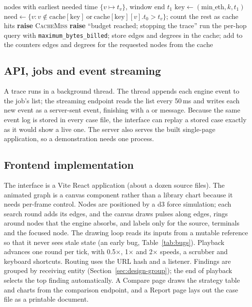 \begin{algorithm}[H]
\caption{Provider fetch with cache and budget}\label{alg:fetch}
\small\singlespacing
\begin{algorithmic}[1]
\Require nodes with earliest needed time $\{v\mapsto t_v\}$, window end $t_1$
\State $\mathrm{key}\gets(\mathrm{min\_eth},k,t_1)$
\State $\mathrm{need}\gets\{v: v\notin\mathrm{cache}[\mathrm{key}]\ \text{or}\ \mathrm{cache}[\mathrm{key}][v].t_0>t_v\}$; count the rest as cache hits
 \State \textbf{raise} \textsc{CacheMiss} \EndIf
{}
   \State \textbf{raise} ``budget reached; stopping the trace'' \EndIf
  \State run the per-hop query with \texttt{maximum\_bytes\_billed}; store edges and degrees in the cache; add to the counters
\EndFor
\State \Return edges and degrees for the requested nodes from the cache
\end{algorithmic}
\end{algorithm}

\subsection{API, jobs and event streaming}
A trace runs in a background thread. The thread appends each engine event to the job's list; the streaming endpoint reads the list every 50\,ms and writes each new event as a server-sent event, finishing with a  or  message. Because the same event log is stored in every case file, the interface can replay a stored case exactly as it would show a live one. The server also serves the built single-page application, so a demonstration needs one process.

\subsection{Frontend implementation}
The interface is a Vite React application (about a dozen source files). The animated graph is a canvas component rather than a library chart because it needs per-frame control. Nodes are positioned by a d3 force simulation; each search round adds its edges, and the canvas draws pulses along edges, rings around nodes that the engine absorbs, and labels only for the source, terminals and the focused node. The drawing loop reads its inputs from a mutable reference so that it never sees stale state (an early bug, Table~\ref{tab:bugs}). Playback advances one round per tick, with 0.5$\times$, 1$\times$ and 2$\times$ speeds, a scrubber and keyboard shortcuts. Routing uses the URL hash and a  listener. Findings are grouped by receiving entity (Section~\ref{sec:design-group}); the end of playback selects the top finding automatically. A Compare page draws the strategy table and charts from the comparison endpoint, and a Report page lays out the case file as a printable document.

